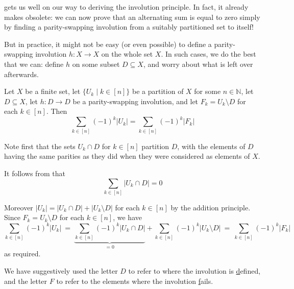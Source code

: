  gets us well on our way to deriving the involution principle. In fact, it already makes  obsolete: we can now prove that an alternating sum is equal to zero simply by finding a parity-swapping involution from a suitably partitioned set to itself!

But in practice, it might not be easy (or even possible) to define a parity-swapping involution $h : X \to X$ on the whole set $X$. In such cases, we do the best that we can: define $h$ on some subset $D \subseteq X$, and worry about what is left over afterwards.

\begin{theorem}
\label{thmInvolutionPrinciple}
Let $X$ be a finite set, let $\{ U_k \mid k \in [n] \}$ be a partition of $X$ for some $n \in \mathbb{N}$, let $D \subseteq X$, let $h : D \to D$ be a parity-swapping involution, and let $F_k = U_k \setminus D$ for each $k \in [n]$. Then
\[ \sum_{k \in [n]} (-1)^k |U_k| = \sum_{k \in [n]} (-1)^k |F_k| \]
\end{theorem}

\begin{cproof}
Note first that the sets $U_k \cap D$ for $k \in [n]$ partition $D$, with the elements of $D$ having the same parities as they did when they were considered as elements of $X$.

It follows from  that
\[ \sum_{k \in [n]} |U_k \cap D| = 0 \]

Moreover $|U_k| = |U_k \cap D| + |U_k \setminus D|$ for each $k \in [n]$ by the addition principle. Since $F_k = U_k \setminus D$ for each $k \in [n]$, we have
\[ \sum_{k \in [n]} (-1)^k |U_k| ~=~ \underbrace{\sum_{k \in [n]} (-1)^k |U_k \cap D|}_{=0} + \sum_{k \in [n]} (-1)^k |U_k \setminus D| ~=~ \sum_{k \in [n]} (-1)^k |F_k| \]
as required.
\end{cproof}

We have suggestively used the letter $D$ to refer to where the involution is \underline{d}efined, and the letter $F$ to refer to the elements where the involution \underline{f}ails.

